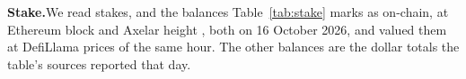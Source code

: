 \documentclass[conference,compsoc]{IEEEtran}
\numberwithin{equation}{section}
\theoremstyle{plain}
\theoremstyle{definition}
\theoremstyle{remark}
\newcommand{\runin}[1]{\par\smallskip\noindent\textbf{#1.}\enspace}
\begin{document}
\runin{Stake}We read stakes, and the balances Table~\ref{tab:stake} marks as on-chain, at Ethereum block \stakeBlock{} and Axelar height \stakeAxelarHeight{}, both on 16 October 2026, and valued them at DefiLlama prices of the same hour. The other balances are the dollar totals the table's sources reported that day.
\end{document}

